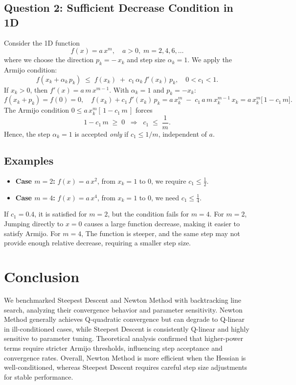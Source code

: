 \documentclass[12pt]{article}
\begin{document}
\subsection{Question 2: Sufficient Decrease Condition in 1D}

Consider the 1D function
\[
f(x) = a \, x^m, \quad a>0, \; m = 2,4,6,\dots
\]
where we choose the direction $p_k = -\,x_k$ and step size $\alpha_k=1$. 
We apply the Armijo condition:
\[
f(x_k + \alpha_k\,p_k) \; \le \; f(x_k) \;+\; c_1\,\alpha_k\,f'(x_k)\,p_k,\quad 0 < c_1 < 1.
\]
If $x_k>0$, then $f'(x) = a\,m\,x^{m-1}$. With $\alpha_k=1$ and $p_k=-x_k$:
\[
f(x_k + p_k) = f(0) = 0, 
\quad
f(x_k) + c_1\,f'(x_k)\,p_k 
= a\,x_k^m \;-\; c_1\,a\,m\,x_k^{m-1}\,x_k 
= a\,x_k^m \bigl[\,1 - c_1\,m\bigr].
\]
The Armijo condition $0 \le a\,x_k^m [\,1 - c_1\,m\,]$ forces 
\[
1 - c_1\,m \;\ge\;0 
\;\;\Longrightarrow\;\; c_1 \;\le\; \frac{1}{m}.
\]
Hence, the step $\alpha_k=1$ is accepted \emph{only} if $c_1 \le 1/m$, independent of $a$.

\subsection*{Examples}
\begin{itemize}
\item \textbf{Case $m=2$:} 
  $f(x)=a\,x^2$, from $x_k=1$ to $0$, we require $c_1\le\frac{1}{2}$.
\item \textbf{Case $m=4$:} 
  $f(x)=a\,x^4$, from $x_k=1$ to $0$, we need $c_1\le \frac{1}{4}$. 
\end{itemize}
If $c_1=0.4$, it is satisfied for $m=2$, but the condition fails for $m=4$. For \( m=2 \), Jumping directly to \( x=0 \) causes a large function decrease, making it easier to satisfy Armijo. For \( m=4 \), The function is steeper, and the same step may not provide enough relative decrease, requiring a smaller step size.
\section{Conclusion}
We benchmarked Steepest Descent and Newton Method with backtracking line search, analyzing their convergence behavior and parameter sensitivity. Newton Method generally achieves Q-quadratic convergence but can degrade to Q-linear in ill-conditioned cases, while Steepest Descent is consistently Q-linear and highly sensitive to parameter tuning. Theoretical analysis confirmed that higher-power terms require stricter Armijo thresholds, influencing step acceptance and convergence rates. Overall, Newton Method is more efficient when the Hessian is well-conditioned, whereas Steepest Descent requires careful step size adjustments for stable performance.
\end{document}
